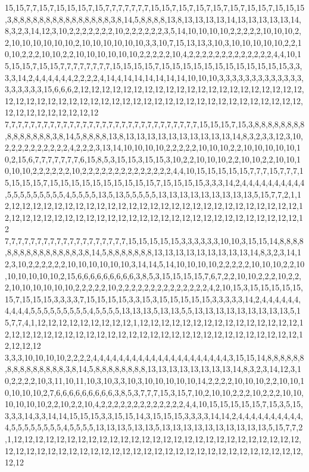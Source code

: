 15,15,7,7,15,7,15,15,15,7,15,7,7,7,7,7,7,7,15,15,7,15,7,15,7,15,7,15,7,15,15,7,15,15,15,3,8,8,8,8,8,8,8,8,8,8,8,8,8,8,8,3,8,14,5,8,8,8,8,13,8,13,13,13,13,14,13,13,13,13,13,14,8,3,2,3,14,12,3,10,2,2,2,2,2,2,2,10,2,2,2,2,2,2,3,5,14,10,10,10,10,2,2,2,2,2,10,10,10,2,2,10,10,10,10,10,10,2,10,10,10,10,10,10,3,3,10,7,15,13,13,3,10,3,10,10,10,10,10,2,2,10,10,2,2,2,10,10,2,2,10,10,10,10,10,10,2,2,2,2,2,10,4,2,2,2,2,2,2,2,2,2,2,2,2,2,4,4,10,15,15,15,7,15,15,7,7,7,7,7,7,7,7,15,15,15,15,7,15,15,15,15,15,15,15,15,15,15,15,15,3,3,3,3,14,2,4,4,4,4,4,4,2,2,2,2,4,14,4,14,14,14,14,14,14,10,10,10,3,3,3,3,3,3,3,3,3,3,3,3,3,3,3,3,3,3,3,15,6,6,6,2,12,12,12,12,12,12,12,12,12,12,12,12,12,12,12,12,12,12,12,12,12,12,12,12,12,12,12,12,12,12,12,12,12,12,12,12,12,12,12,12,12,12,12,12,12,12,12,12,12,12,12,12,12,12,12,12,12,12
7,7,7,7,7,7,7,7,7,7,7,7,7,7,7,7,7,7,7,7,7,7,7,7,7,7,7,7,7,7,15,15,15,7,15,3,8,8,8,8,8,8,8,8,8,8,8,8,8,8,8,3,8,14,5,8,8,8,8,13,8,13,13,13,13,13,13,13,13,13,13,14,8,3,2,3,3,12,3,10,2,2,2,2,2,2,2,2,2,2,4,2,2,2,3,13,14,10,10,10,10,2,2,2,2,2,10,10,10,2,2,10,10,10,10,10,10,2,15,6,7,7,7,7,7,7,7,6,15,8,5,3,15,15,3,15,15,3,10,2,2,10,10,10,2,2,10,10,2,2,10,10,10,10,10,2,2,2,2,2,2,10,2,2,2,2,2,2,2,2,2,2,2,2,2,2,4,4,10,15,15,15,15,15,7,7,7,15,7,7,7,15,15,15,15,7,15,15,15,15,15,15,15,15,15,15,7,15,15,15,15,3,3,3,14,2,4,4,4,4,4,4,4,4,4,4,5,5,5,5,5,5,5,5,5,4,5,5,5,5,13,5,13,5,5,5,5,5,13,13,13,13,13,13,13,13,13,5,15,7,7,2,1,12,12,12,12,12,12,12,12,12,12,12,12,12,12,12,12,12,12,12,12,12,12,12,12,12,12,12,12,12,12,12,12,12,12,12,12,12,12,12,12,12,12,12,12,12,12,12,12,12,12,12,12,12,12,12,12,12
7,7,7,7,7,7,7,7,7,7,7,7,7,7,7,7,7,7,7,15,15,15,15,15,3,3,3,3,3,3,10,10,3,15,15,14,8,8,8,8,8,8,8,8,8,8,8,8,8,8,8,3,8,14,5,8,8,8,8,8,8,8,13,13,13,13,13,13,13,13,13,14,8,3,2,3,14,12,3,10,2,2,2,2,2,2,10,10,10,10,10,10,3,14,14,5,14,10,10,10,10,2,2,2,2,2,10,10,10,2,2,10,10,10,10,10,10,2,15,6,6,6,6,6,6,6,6,6,3,8,5,3,15,15,15,15,7,6,7,2,2,10,10,2,2,2,10,2,2,2,10,10,10,10,10,10,2,2,2,2,2,10,2,2,2,2,2,2,2,2,2,2,2,2,2,2,4,2,10,15,3,15,15,15,15,15,15,7,15,15,15,3,3,3,3,7,15,15,15,15,3,3,15,3,15,15,15,15,15,3,3,3,3,3,14,2,4,4,4,4,4,4,4,4,4,4,5,5,5,5,5,5,5,5,5,4,5,5,5,5,13,13,13,5,13,13,5,5,13,13,13,13,13,13,13,13,13,5,15,7,7,4,1,12,12,12,12,12,12,12,12,12,1,12,12,12,12,12,12,12,12,12,12,12,12,12,12,12,12,12,12,12,12,12,12,12,12,12,12,12,12,12,12,12,12,12,12,12,12,12,12,12,12,12,12,12,12,12,12,12
3,3,3,10,10,10,10,2,2,2,2,4,4,4,4,4,4,4,4,4,4,4,4,4,4,4,4,4,4,4,4,4,3,15,15,14,8,8,8,8,8,8,8,8,8,8,8,8,8,8,8,3,8,14,5,8,8,8,8,8,8,8,8,13,13,13,13,13,13,13,13,14,8,3,2,3,14,12,3,10,2,2,2,2,10,3,11,10,11,10,3,10,3,3,10,3,10,10,10,10,10,14,2,2,2,2,10,10,10,2,2,10,10,10,10,10,10,2,7,6,6,6,6,6,6,6,6,6,3,8,5,3,7,7,7,15,3,15,7,10,2,10,10,2,2,2,10,2,2,2,10,10,10,10,10,10,2,2,10,2,2,10,4,2,2,2,2,2,2,2,2,2,2,2,2,2,4,4,10,15,15,15,15,15,7,15,3,5,15,3,3,3,14,3,3,14,14,15,15,15,3,3,15,15,14,3,15,15,15,3,3,3,3,14,14,2,4,4,4,4,4,4,4,4,4,4,4,5,5,5,5,5,5,5,5,4,5,5,5,5,13,13,13,5,13,13,5,13,13,13,13,13,13,13,13,13,13,5,15,7,7,2,1,12,12,12,12,12,12,12,12,12,12,12,12,12,12,12,12,12,12,12,12,12,12,12,12,12,12,12,12,12,12,12,12,12,12,12,12,12,12,12,12,12,12,12,12,12,12,12,12,12,12,12,12,12,12,12,12,12
